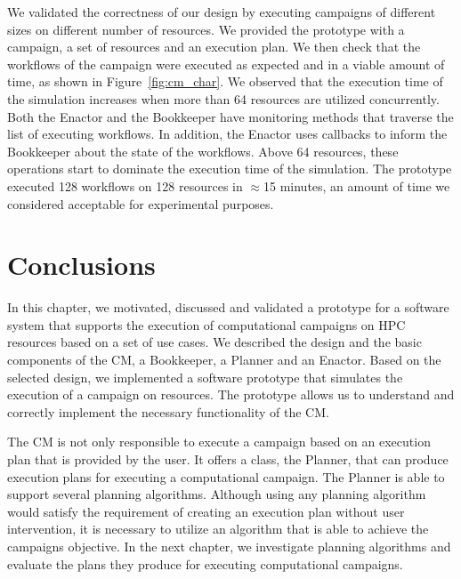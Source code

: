 We validated the correctness of our design by executing campaigns of different
sizes on different number of resources. We provided the prototype with a
campaign, a set of resources and an execution plan. We then check that the
workflows of the campaign were executed as expected and in a viable amount of
time, as shown in Figure~\ref{fig:cm_char}. We observed that the execution time 
of the simulation increases when more than 64
resources are utilized concurrently. Both the Enactor and the Bookkeeper have
monitoring methods that traverse the list of executing workflows. In
addition, the Enactor uses callbacks to inform the Bookkeeper about the state of
the workflows. Above 64 resources, these operations start to dominate the
execution time of the simulation. The prototype executed 128
workflows on 128 resources in $\approx$15 minutes, an amount of time we considered acceptable for experimental purposes.


\section{Conclusions}
\label{sec:cm_concl}
In this chapter, we motivated, discussed and validated a prototype for a
software system that supports the execution of computational campaigns on HPC
resources based on a set of use cases. We described the design and the basic
components of the CM, a Bookkeeper, a Planner and an Enactor.
Based on the selected design, we implemented a software prototype that simulates
the execution of a campaign on resources. The prototype allows us to understand
and correctly implement the necessary functionality of the CM.

The CM is not only responsible to execute a campaign based on an
execution plan that is provided by the user. It offers a class, the Planner,
that can produce execution plans for executing a computational campaign. The
Planner is able to support several planning algorithms. Although using any
planning algorithm would satisfy the requirement of creating an execution plan
without user intervention, it is necessary to utilize an algorithm that is able
to achieve the campaigns objective. In the next chapter, we investigate planning
algorithms and evaluate the plans they produce for executing computational
campaigns.
